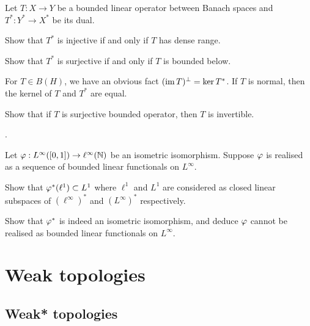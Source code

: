\documentclass{../note}
\begin{document}
\begin{prb}
Let $T:X\to Y$ be a bounded linear operator between Banach spaces and $T^*:Y^*\to X^*$ be its dual.
\begin{parts}
\item
Show that $T^*$ is injective if and only if $T$ has dense range.
\item
Show that $T^*$ is surjective if and only if $T$ is bounded below.
\end{parts}
\end{prb}

\begin{prb}
For $T\in B(H)$, we have an obvious fact $(\operatorname{im} T)^\perp=\ker T^*$.
If $T$ is normal, then the kernel of $T$ and $T^*$ are equal.
\begin{parts}
\item
Show that if $T$ is surjective bounded operator, then $T$ is invertible.
\end{parts}
\end{prb}


\begin{prb}
.
\end{prb}


\begin{prb}
Let $\varphi:L^\infty([0,1])\to\ell^\infty(\mathbb{N})$ be an isometric isomorphism.
Suppose $\varphi$ is realised as a sequence of bounded linear functionals on $L^\infty$.
\begin{parts}
\item
Show that $\varphi^*(\ell^1)\subset L^1$ where $\ell^1$ and $L^1$ are considered as closed linear subspaces of $(\ell^\infty)^*$ and $(L^\infty)^*$ respectively.
\item Show that $\varphi^*$ is indeed an isometric isomorphism, and deduce $\varphi$ cannot be realised as bounded linear functionals on $L^\infty$.
\end{parts}
\end{prb}














\part{Weak topologies}
\chapter{Weak* topologies}
\end{document}
